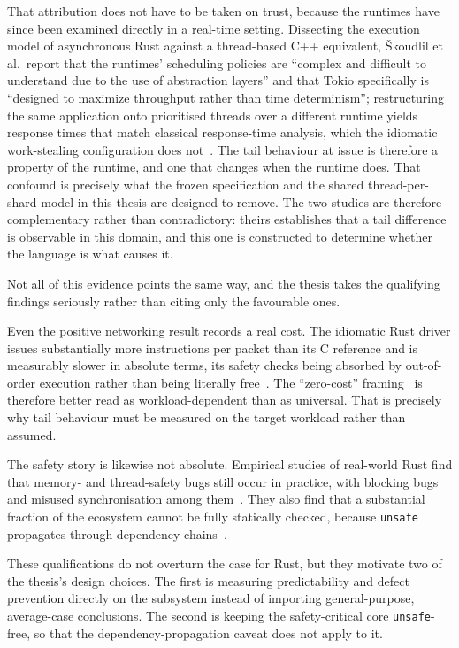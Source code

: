 \documentclass[english,twoside,openright,a4paper,censored,csm,software-track-2020]{HYthesisML}
\begin{document}
That attribution does not have to be taken on trust, because the runtimes have since been
examined directly in a real-time setting. Dissecting the execution model of asynchronous Rust
against a thread-based C++ equivalent, \v{S}koudlil et al.\ report that the
runtimes' scheduling policies are ``complex and difficult to understand due to the use of
abstraction layers'' and that Tokio specifically is ``designed to maximize throughput rather than
time determinism''; restructuring the same application onto prioritised threads over a different
runtime yields response times that match classical response-time analysis, which the idiomatic
work-stealing configuration does not~\cite{skoudlil2025asyncrust}. The tail behaviour at issue is
therefore a property of the runtime, and one that changes when the runtime does. That confound is
precisely what the frozen specification and the shared thread-per-shard model in this thesis are
designed to remove. The two studies are therefore complementary rather than contradictory:
theirs establishes that a tail difference is observable in this domain, and this one is
constructed to determine whether the language is what causes it.

Not all of this evidence points the same way, and the thesis takes the qualifying findings
seriously rather than citing only the favourable ones.

Even the positive networking result records a real cost. The idiomatic Rust driver issues
substantially more instructions per packet than its C reference and is measurably slower in
absolute terms, its safety checks being absorbed by out-of-order execution rather than being
literally free~\cite{emmerich2019drivers}. The ``zero-cost''
framing~\cite{balasubramanian2017rust} is therefore better read as workload-dependent than as
universal. That is precisely why tail behaviour must be measured on the target workload rather
than assumed.

The safety story is likewise not absolute. Empirical studies of real-world Rust find that memory-
and thread-safety bugs still occur in practice, with blocking bugs and misused synchronisation
among them~\cite{qin2020rust,qin2024safety}. They also find that a substantial fraction of the
ecosystem cannot be fully statically checked, because \texttt{unsafe} propagates through
dependency chains~\cite{evans2020rust}.

These qualifications do not overturn the case for Rust, but they motivate two of the thesis's
design choices. The first is measuring predictability and defect prevention directly on the
subsystem instead of importing general-purpose, average-case conclusions. The second is keeping
the safety-critical core \texttt{unsafe}-free, so that the dependency-propagation caveat does not
apply to it.
\end{document}
